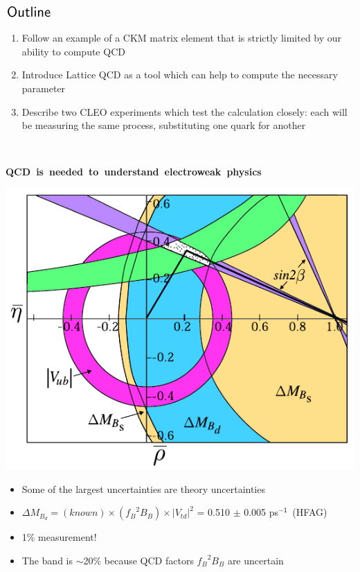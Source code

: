 \documentclass[landscape]{article}
\newenvironment{slide}[1][ ]{\mbox{\bf \boldmath #1 } \vfill}{\vfill \vspace{-1.5 cm} \mbox{ } \pagebreak}
\newenvironment{itemizer}[1]{\begin{itemize}\setlength{\itemsep}{#1}}{\end{itemize}}
\newcommand{\inv}{$^{\mathsf{-1}}$}
\begin{document}
\begin{slide}

\begin{center}
  \includegraphics[width=5 cm]{title_outline}
\end{center}

\vspace{1 cm}

\begin{enumerate}\setlength{\itemsep}{2 cm}

  \item Follow an example of a CKM matrix element that is strictly
  limited by our ability to compute QCD

  \item Introduce Lattice QCD as a tool which can help to compute the
  necessary parameter
  
  \item Describe two CLEO experiments which test the calculation
  closely: each will be measuring the same process, substituting one
  quark for another

\end{enumerate}

\end{slide}

\begin{slide}[QCD is needed to understand electroweak physics]
  
\vfill

\begin{center}
  \includegraphics[width=0.55\linewidth]{../ckm04}
\end{center}

\begin{itemizer}{0.5 cm}

  \item Some of the largest uncertainties are theory uncertainties

  \item $\Delta M_{B_d} = (known) \times ({f_B}^2 B_B) \times |V_{td}|^2$ = 0.510 $\pm$ 0.005 ps\inv\ (HFAG)

  \item 1\% measurement!

  \item The band is $\sim$20\% because QCD factors ${f_B}^2 B_B$ are uncertain

\end{itemizer}

\end{slide}
\end{document}
